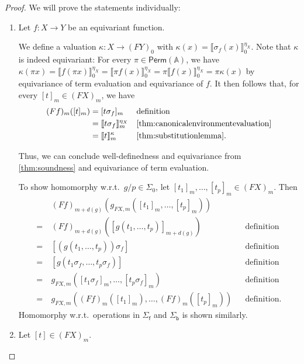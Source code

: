 \documentclass[a4paper,UKenglish,cleveref,thm-restate,numberwithinsect,final]{lipics-v2021}
\newcommand{\Perm}{\mathsf{Perm}(\Names)}
\newcommand{\sigp}{\Sigma_0}
\newcommand{\sigf}{\Sigma_{\mathsf f}}
\newcommand{\sigb}{\Sigma_{\mathsf b}}
\newcommand{\Names}{\mathbb{A}}
\theoremstyle{plain}
\numberwithin{equation}{section}
\newcommand{\+}[1]{\mathcal{#1}\xspace}
\theoremstyle{definition}
\begin{document}
\begin{proof}
    We will prove the statements individually:
    \begin{enumerate}[wide]
        \item \label{itm:freemodelfunctorequivariance}
            Let \(f: X \to Y\) be an equivariant function.

            We define a valuation \(\kappa: X \to (FY)_0\) with \(\kappa(x) = \llbracket \sigma_f(x) \rrbracket^{\eta_X}_0\).
            Note that \(\kappa\) is indeed equivariant:
            For every \(\pi \in \Perm\), we have \(\kappa(\pi x) = \llbracket f(\pi x) \rrbracket^{\eta_X}_0 = \llbracket \pi f(x) \rrbracket^{\eta_X}_0 = \pi\llbracket f(x) \rrbracket^{\eta_X}_0 = \pi\kappa(x)\) by equivariance of term evaluation and equivariance of \(f\).
            It then follows that, for every \([t]_m \in (FX)_m\), we have
            \begin{align*}
                (Ff)_m([t]_m)
                &= [t\sigma_f]_m && \text{definition} \\
                &= \llbracket t\sigma_f \rrbracket^{\eta_X}_m && \text{\cref{thm:canonicalenvironmentevaluation}} \\
                &= \llbracket t \rrbracket^\kappa_m && \text{\cref{thm:substitutionlemma}}.
            \end{align*}

            Thus, we can conclude well-definedness and equivariance from \cref{thm:soundness} and equivariance of term evaluation.

            To show homomorphy w.r.t.~\(g/p \in \sigp\), let \([t_1]_m, \ldots, [t_p]_m \in (FX)_m\).
            Then
            \begin{align*}
                &(Ff)_{m + d(g)}(g_{FX, m}([t_1]_m, \ldots, [t_p]_m)) \\
                =~&(Ff)_{m + d(g)}([g(t_1, \ldots, t_p)]_{m + d(g)}) && \text{definition} \\
                =~&[(g(t_1, \ldots, t_p))\sigma_f] && \text{definition} \\
                =~&[g(t_1\sigma_f, \ldots, t_p\sigma_f)] && \text{definition} \\
                =~&g_{FX, m}([t_1\sigma_f]_m, \ldots, [t_p\sigma_f]_m) && \text{definition} \\
                =~&g_{FX, m}((Ff)_m([t_1]_m), \ldots, (Ff)_m([t_p]_m)) && \text{definition}.
            \end{align*}
            Homomorphy w.r.t.\ operations in $\sigf$ and $\sigb$ is shown similarly.
        \item
            Let \([t] \in (FX)_m\).


\end{enumerate}
\end{proof}
\end{document}
